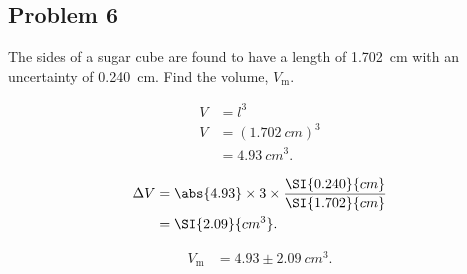 
\subsection{Problem 6}

The sides of a sugar cube are found to have a length of \SI{1.702}{cm} with an uncertainty of \SI{0.240}{cm}. Find the volume, $V_{\mathrm{m}}$.

\begin{align*}
	V &= l^3 \\
	V &= \left( \SI{1.702}{cm} \right)^3 \\
	&= \SI{4.93}{cm^3}
	.\end{align*}

\begin{align*}
	\Delta V &= \abs{ 4.93 } \times 3 \times \frac{\SI{0.240}{cm}}{\SI{1.702}{cm}} \\
	&= \SI{2.09}{cm^3}
	.\end{align*}

\begin{align*}
	V_{\mathrm{m}} &= 4.93 \pm \SI{2.09}{cm^3}
	.\end{align*}
